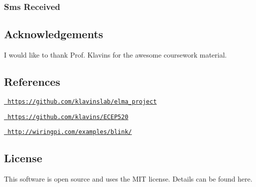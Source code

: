 \subsubsection*{Sms Received}



\subsection*{Acknowledgements}

I would like to thank Prof. Klavins for the awesome coursework material.

\subsection*{References}

\href{https://github.com/klavinslab/elma_project}{\texttt{ https\+://github.\+com/klavinslab/elma\+\_\+project}}

\href{https://github.com/klavins/ECEP520}{\texttt{ https\+://github.\+com/klavins/\+E\+C\+E\+P520}}

\href{http://wiringpi.com/examples/blink/}{\texttt{ http\+://wiringpi.\+com/examples/blink/}}

\subsection*{License}

This software is open source and uses the M\+IT license. Details can be found here. 